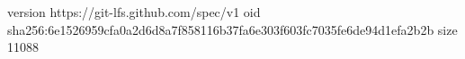 version https://git-lfs.github.com/spec/v1
oid sha256:6e1526959cfa0a2d6d8a7f858116b37fa6e303f603fc7035fe6de94d1efa2b2b
size 11088
